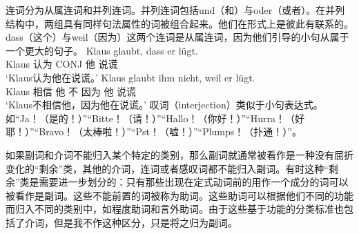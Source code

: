 连词分为从属连词和并列连词。并列连词包括und（和）与oder（或者）。在并列结构中，两组具有同样句法属性的词被组合起来。他们在形式上是彼此有联系的。dass（这个）与weil（因为）这两个连词是从属连词，因为他们引导的小句从属于一个更大的句子。
\eal
\ex 
\gll Klaus glaubt, dass er lügt.\\
	 Klaus 认为 CONJ 他 说谎\\
\glt `Klaus认为他在说谎。'
\ex 
\gll Klaus glaubt ihm nicht, weil er lügt.\\
	 Klaus 相信 他 不 因为 他 说谎\\
\glt `Klaus不相信他，因为他在说谎。'
\zl
叹词（interjection）类似于小句表达式。如“Ja！（是的！）”“Bitte！（请！）”“Hallo！（你好！）”“Hurra！（好耶！）”“Bravo！（太棒啦！）”“Pst！（嘘！）”“Plumps！（扑通！）”。
 
如果副词和介词不能归入某个特定的类别，那么副词就通常被看作是一种没有屈折变化的“剩余”类，其他的介词，连词或者感叹词都不能归入副词。有时这种“剩余”类是需要进一步划分的：只有那些出现在定式动词前的用作一个成分的词可以被看作是副词。这些不能前置的词被称为助词。这些助词可以根据他们不同的功能而归入不同的类别中，如程度助词和言外助词。由于这些基于功能的分类标准也包括了介词，但是我不作这种区分，只是将之归为副词。

